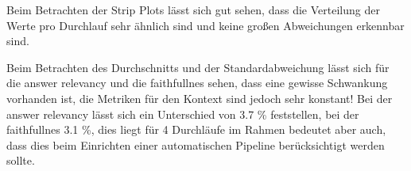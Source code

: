 Beim Betrachten der Strip Plots lässt sich gut sehen, dass die Verteilung der Werte pro Durchlauf sehr ähnlich sind und keine großen Abweichungen erkennbar sind.

\begin{table}[h!]
    \centering
    \caption{Durchschnittswerte und Standardabweichungen der Metriken über vier Durchläufe für DeepSeek}
\end{table}

Beim Betrachten des Durchschnitts und der Standardabweichung lässt sich für die answer relevancy und die faithfullnes sehen, dass eine gewisse Schwankung vorhanden ist, die Metriken für den Kontext sind jedoch sehr konstant!
Bei der answer relevancy lässt sich ein Unterschied von 3.7 \% feststellen, bei der faithfullnes 3.1 \%, dies liegt für 4 Durchläufe im Rahmen bedeutet aber auch, dass dies beim Einrichten einer automatischen Pipeline berücksichtigt werden sollte.

\begin{table}[h!]
    \centering
    \caption{Durchschnittswerte und Standardabweichungen der Metriken über vier Durchläufe für GPT-4}
\end{table}


